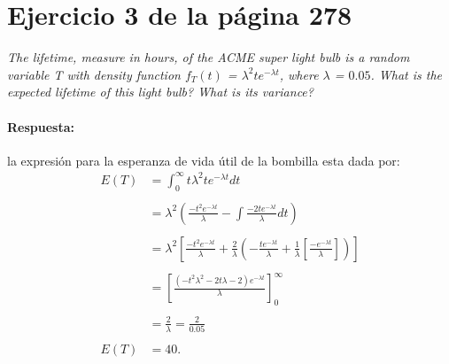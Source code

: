 \documentclass{article}
\begin{document}
 
	
\section{Ejercicio 3 de la página 278}   	
	
\emph{The lifetime, measure in hours, of the ACME super light bulb is a random variable T with density function $f_{T}(t)$ = $\lambda^2 te^{- \lambda t}$, where $\lambda$ = $0.05$. What is the expected lifetime of this light bulb? What is its variance?}
	
	
\paragraph{Respuesta:} la expresión para la esperanza de vida útil de la bombilla esta dada por: 
	\begin{equation}
		\begin{array}{ll}
			E(T) & = \int_{0}^{\infty} t \lambda^2 t e^{-\lambda t}  dt\\
			&\\
&	= \lambda^{2}\left( \frac{-t^{2}e^{-\lambda t}}{\lambda} - \int \frac{-2te^{-\lambda t}}{\lambda}dt\right) \\
	&\\
  & = \lambda^{2}\left[ \frac{-t^{2}e^{-\lambda t}}{\lambda} + \frac{2}{\lambda}\left( - \frac{te^{-\lambda t}}{\lambda} + \frac{1}{\lambda}\left[ \frac{-e^{-\lambda t}}{\lambda}\right] \right) \right] \\
 	&\\
 & = \left[ \frac{\left( -t^{2} \lambda^{2} - 2t\lambda -2\right) e^{-\lambda t}}{\lambda} \right]^{\infty}_{0}\\
 	&\\
 & = \frac{2}{\lambda} = \frac{2}{0.05}\\
 	&\\
E(T) & = 40.

				\end{array}	
	\end{equation}
\end{document}
